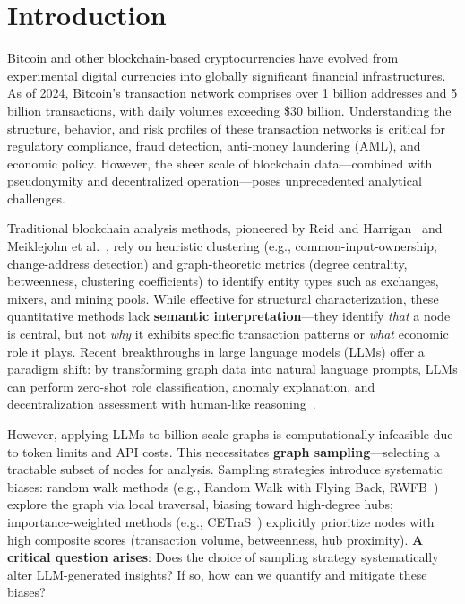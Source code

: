 
\section{Introduction}

Bitcoin and other blockchain-based cryptocurrencies have evolved from experimental digital currencies into globally significant financial infrastructures. As of 2024, Bitcoin's transaction network comprises over 1 billion addresses and 5 billion transactions, with daily volumes exceeding \$30 billion. Understanding the structure, behavior, and risk profiles of these transaction networks is critical for regulatory compliance, fraud detection, anti-money laundering (AML), and economic policy. However, the sheer scale of blockchain data---combined with pseudonymity and decentralized operation---poses unprecedented analytical challenges.

Traditional blockchain analysis methods, pioneered by Reid and Harrigan~\cite{reid2011} and Meiklejohn et al.~\cite{meiklejohn2013fistful}, rely on heuristic clustering (e.g., common-input-ownership, change-address detection) and graph-theoretic metrics (degree centrality, betweenness, clustering coefficients) to identify entity types such as exchanges, mixers, and mining pools. While effective for structural characterization, these quantitative methods lack \textbf{semantic interpretation}---they identify \textit{that} a node is central, but not \textit{why} it exhibits specific transaction patterns or \textit{what} economic role it plays. Recent breakthroughs in large language models (LLMs) offer a paradigm shift: by transforming graph data into natural language prompts, LLMs can perform zero-shot role classification, anomaly explanation, and decentralization assessment with human-like reasoning~\cite{lei2025llm}.

However, applying LLMs to billion-scale graphs is computationally infeasible due to token limits and API costs. This necessitates \textbf{graph sampling}---selecting a tractable subset of nodes for analysis. Sampling strategies introduce systematic biases: random walk methods (e.g., Random Walk with Flying Back, RWFB~\cite{leskovec2006sampling}) explore the graph via local traversal, biasing toward high-degree hubs; importance-weighted methods (e.g., CETraS~\cite{lei2025llm}) explicitly prioritize nodes with high composite scores (transaction volume, betweenness, hub proximity). \textbf{A critical question arises}: Does the choice of sampling strategy systematically alter LLM-generated insights? If so, how can we quantify and mitigate these biases?

